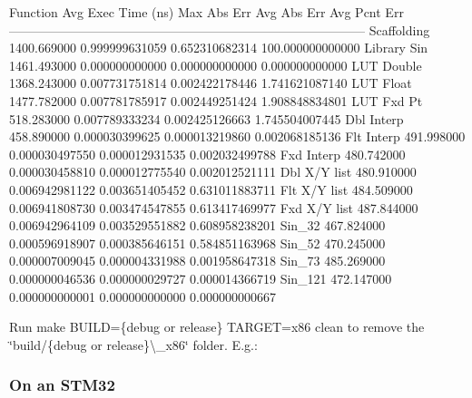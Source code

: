 \begin{DoxyEnumerate}
\begin{DoxyCode}
Function        Avg Exec Time (ns)  Max Abs Err     Avg Abs Err     Avg Pcnt Err
------------------------------------------------------------------------------------
Scaffolding     1400.669000         0.999999631059  0.652310682314  100.000000000000
Library Sin     1461.493000         0.000000000000  0.000000000000  0.000000000000
LUT Double      1368.243000         0.007731751814  0.002422178446  1.741621087140
LUT Float       1477.782000         0.007781785917  0.002449251424  1.908848834801
LUT Fxd Pt      518.283000          0.007789333234  0.002425126663  1.745504007445
Dbl Interp      458.890000          0.000030399625  0.000013219860  0.002068185136
Flt Interp      491.998000          0.000030497550  0.000012931535  0.002032499788
Fxd Interp      480.742000          0.000030458810  0.000012775540  0.002012521111
Dbl X/Y list    480.910000          0.006942981122  0.003651405452  0.631011883711
Flt X/Y list    484.509000          0.006941808730  0.003474547855  0.613417469977
Fxd X/Y list    487.844000          0.006942964109  0.003529551882  0.608958238201
Sin\_32          467.824000          0.000596918907  0.000385646151  0.584851163968
Sin\_52          470.245000          0.000007009045  0.000004331988  0.001958647318
Sin\_73          485.269000          0.000000046536  0.000000029727  0.000014366719
Sin\_121         472.147000          0.000000000001  0.000000000000  0.000000000667
\end{DoxyCode}

\item Run {\ttfamily make B\+U\+I\+LD=\{debug or release\} T\+A\+R\+G\+ET=x86 clean} to remove the \char`\"{}build/\{debug or release\}\textbackslash{}\+\_\+x86\char`\"{} folder. E.\+g.\+: 

\end{DoxyEnumerate}

\subsubsection*{On an S\+T\+M32}


